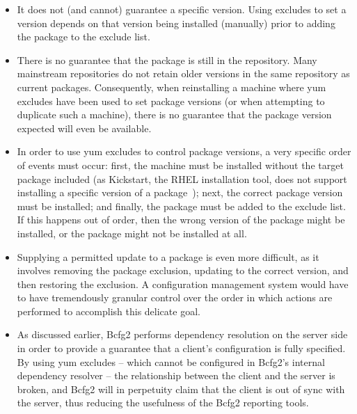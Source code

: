 \begin{itemize}

\item It does not (and cannot) guarantee a specific version.  Using
  excludes to set a version depends on that version being installed
  (manually) prior to adding the package to the exclude list.

\item There is no guarantee that the package is still in the
  repository.  Many mainstream repositories do not retain older versions in the same
  repository as current packages.  Consequently, when reinstalling a
  machine where yum excludes have been used to set package versions
  (or when attempting to duplicate such a machine), there is no
  guarantee that the package version expected will even be available.

\item In order to use yum excludes to control package versions, a very
  specific order of events must occur: first, the machine must be
  installed without the target package included (as Kickstart, the
  RHEL installation tool, does not support installing a specific
  version of a package~\cite{Ana11}); next, the correct package
  version must be installed; and finally, the package must be added to
  the exclude list.  If this happens out of order, then the wrong
  version of the package might be installed, or the package might not
  be installed at all.

\item Supplying a permitted update to a package is even more
  difficult, as it involves removing the package exclusion, updating
  to the correct version, and then restoring the exclusion.  A
  configuration management system would have to have tremendously
  granular control over the order in which actions are performed to
  accomplish this delicate goal.

\item As discussed earlier, Bcfg2 performs dependency resolution on
  the server side in order to provide a guarantee that a client's
  configuration is fully specified.  By using yum excludes -- which
  cannot be configured in Bcfg2's internal dependency resolver -- the
  relationship between the client and the server is broken, and Bcfg2
  will in perpetuity claim that the client is out of sync with the
  server, thus reducing the usefulness of the Bcfg2 reporting tools.

\end{itemize}

